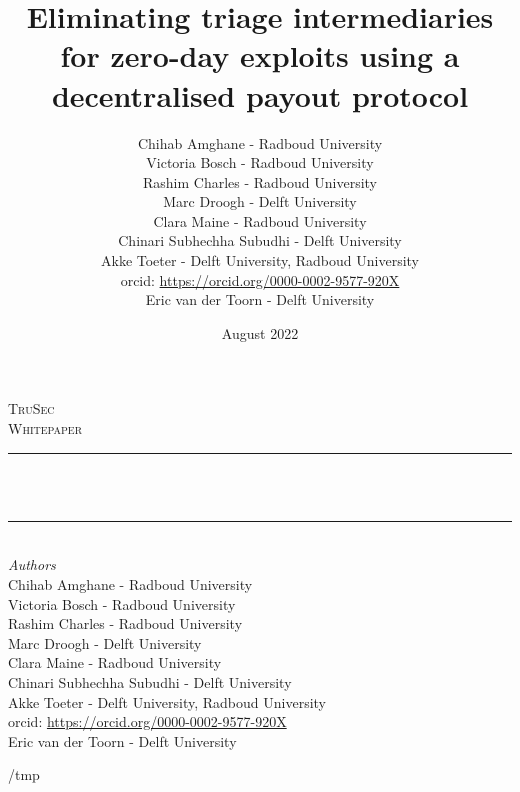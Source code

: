 \documentclass{article}
\title{Eliminating triage intermediaries for zero-day exploits using a decentralised payout protocol}
\author{Chihab Amghane - Radboud University\\Victoria Bosch - Radboud University\\Rashim Charles - Radboud University\\Marc Droogh - Delft University\\Clara Maine - Radboud University\\Chinari Subhechha Subudhi - Delft University\\Akke Toeter - Delft University, Radboud University\\orcid: \url{https://orcid.org/0000-0002-9577-920X}\\Eric van der Toorn - Delft University}
\date{August 2022}
\def\overleafhome{/tmp}%
\begin{document}
\makeatletter
\renewcommand{\maketitle}{%
       \begin{titlepage}%
    \newcommand{\HRule}{\rule{\linewidth}{0.5mm}}%
    \center%
    \textsc{\LARGE TruSec}\\[1cm]%
    \textsc{\Large Whitepaper}\\[0.2cm]%
    \HRule \\[0.8cm]%
    {\huge \bfseries \@title}\\[0.7cm]%
    {}%
    \HRule \\[2cm]%
    \large%
    \emph{Authors}\\[2mm]%
    {Chihab Amghane - Radboud University\\Victoria Bosch - Radboud University\\Rashim Charles - Radboud University\\Marc Droogh - Delft University\\Clara Maine - Radboud University\\Chinari Subhechha Subudhi - Delft University\\Akke Toeter - Delft University, Radboud University\\orcid: \url{https://orcid.org/0000-0002-9577-920X}\\Eric van der Toorn - Delft University}
    \end{titlepage}%
}
\makeatother

\maketitle

\ifx\homepath\overleafhome
    
    
    
    
    
\else
    
    
    
    
    
\fi
\end{document}
